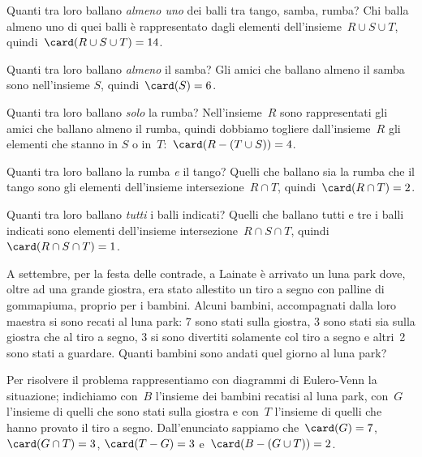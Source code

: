 \begin{exrig}
\begin{esempio}
\begin{enumeratea}
\item Quanti tra loro ballano \emph{almeno uno} dei balli tra tango, samba, rumba? Chi balla almeno uno di quei balli è rappresentato dagli elementi
dell'insieme~$R\cup S\cup T$, quindi~$\card(R\cup S\cup T)=14$.

\item Quanti tra loro ballano \emph{almeno} il samba?
Gli amici che ballano almeno il samba sono nell'insieme
$S$, quindi~$\card(S)=6$.

\item Quanti tra loro ballano \emph{solo} la rumba? Nell'insieme~$R$ sono rappresentati gli amici che
ballano almeno il rumba, quindi dobbiamo togliere dall'insieme~$R$ gli elementi che stanno in
$S$ o in~$T$:~$\card(R-(T\cup S))=4$.

\item Quanti tra loro ballano la rumba \emph{e} il tango? Quelli che ballano sia la rumba che il tango sono gli elementi
dell'insieme intersezione~$R\cap T$, quindi~$\card(R\cap T)=2$.

\item Quanti tra loro ballano \emph{tutti} i balli indicati? Quelli che ballano tutti e tre i balli indicati sono elementi
dell'insieme intersezione~$R\cap S\cap T$, quindi~$\card(R\cap S\cap T)=1$.
\end{enumeratea}
 \end{esempio}

 \begin{esempio}
 A settembre, per la festa delle contrade, a Lainate è arrivato un luna
park dove, oltre ad una grande giostra, era stato allestito un tiro a
segno con palline di gommapiuma, proprio per i bambini. Alcuni
bambini, accompagnati dalla loro maestra si sono recati al luna park: 7
sono stati sulla giostra, 3 sono stati sia sulla giostra che al tiro a
segno, 3 si sono divertiti solamente col tiro a segno e altri~2 sono
stati a guardare. Quanti bambini sono andati quel giorno al luna park?

\begin{multicols}{2}
Per risolvere il problema rappresentiamo con diagrammi di Eulero-Venn la situazione; indichiamo con~$B$ l'insieme dei
bambini recatisi al luna park, con~$G$ l'insieme di quelli che sono stati sulla giostra e con~$T$ l'insieme
di quelli che hanno provato il tiro a segno.
Dall'enunciato sappiamo che~$\card(G)=7$, $\card(G\cap T)=3$, $\card(T-G)=3$ e~$\card(B-(G\cup T))=2$.
\begin{center}
 
\end{center}
\end{multicols}


\end{esempio}
\end{exrig}
